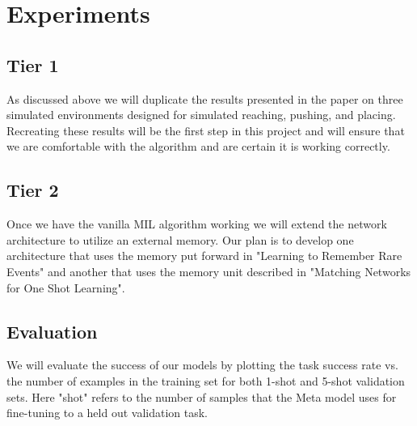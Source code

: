 \section{Experiments}
\subsection{Tier 1}
As discussed above we will duplicate the results presented in the paper 
on three simulated environments designed for simulated reaching, 
pushing, and placing. Recreating these results will be the first
step in this project and will ensure that we are comfortable with 
the algorithm and are certain it is working correctly. 

\subsection{Tier 2}
Once we have the vanilla MIL algorithm working we will extend the network
architecture to utilize an external memory. Our plan is to develop one
architecture that uses the memory put forward in "Learning to Remember Rare Events"
and another that uses the memory unit described in 
"Matching Networks for One Shot Learning".

\subsection{Evaluation}
We will evaluate the success of our models by plotting the task success rate
vs. the number of examples in the training set for both 1-shot and 5-shot validation
sets. Here "shot" refers to the number of samples that the Meta model 
uses for fine-tuning to a held out validation task.

